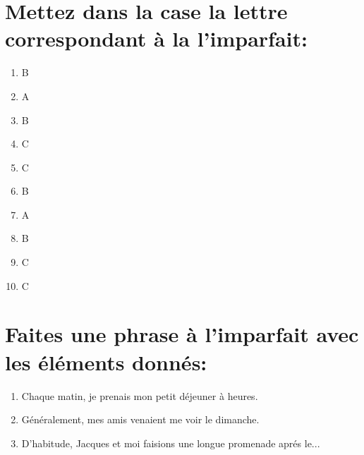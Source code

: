 \section{Mettez dans la case la lettre correspondant à la l'imparfait:}

\begin{enumerate}
    \item B
    \item A
    \item B
    \item C
    \item C
    \item B
    \item A
    \item B
    \item C
    \item C
\end{enumerate}

\section{Faites une phrase à l'imparfait avec les éléments donnés:}

\begin{enumerate}
    \item Chaque matin, je prenais mon petit déjeuner à heures.
    \item Généralement, mes amis venaient me voir le dimanche.
    \item D'habitude, Jacques et moi faisions une longue promenade aprés le...
\end{enumerate}